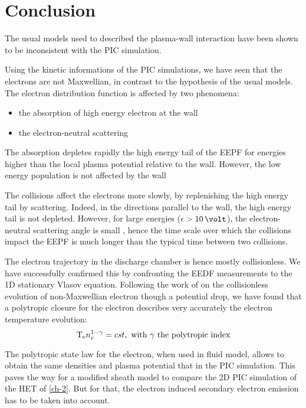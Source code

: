 
\section{Conclusion }
\label{sec-ch3conclusion}

The usual models used to described the plasma-wall interaction have been shown to be inconsistent with the \ac{PIC} simulation. 

Using the kinetic informations of the \ac{PIC} simulations, we have seen that the electrons are not Maxwellian, in contrast to the hypothesis of the usual models.
The electron distribution function is affected by two phenomena\string:
\begin{itemize}
  \item the absorption of high energy electron at the wall
  \item the electron-neutral scattering
\end{itemize}
\vspace{1em}
The absorption depletes rapidly the high energy tail of the EEPF for energies higher than the local plasma potential relative to the wall.
However, the low energy population is not affected by the wall

The collisions affect the electrons more slowly, by replenishing the high energy tail by scattering.
Indeed, in the directions parallel to the wall, the high energy tail is not depleted.
However, for large energies ($\ek > 10\,\volt$), the electron-neutral scattering angle is small \citep{vahedi1995}, hence the time scale over which the collisions impact the EEPF is much longer than the typical time between two collisions.

The electron trajectory in the discharge chamber is hence mostly collisionless.
We have successfully confirmed this by confronting the EEDF measurements to the 1D stationary Vlasov equation.
Following the work of \citet{zhang2016} on the collisionless evolution of non-Maxwellian electron though a potential drop, we have found that a polytropic closure for the electron describes very accurately the electron temperature evolution\string:
\begin{equation*} \label{eq-polyp2}
  \mathrm{T_e} n_e^{1-\gamma} = cst, \text{ with $\gamma$ the polytropic index}
\end{equation*}

The polytropic state law for the electron, when used in fluid model, allows to obtain the same densities and plasma potential that in the \ac{PIC} simulation.
This paves the way for a modified sheath model to compare the \ac{2D} \ac{PIC} simulation of the \ac{HET} of \cref{ch-2}.
But for that, the electron induced secondary electron emission has to be taken into account.

